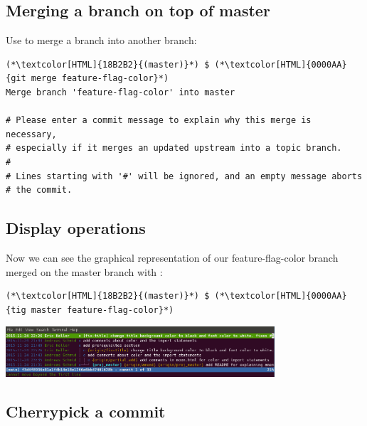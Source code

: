 \subsection{Merging a branch on top of master}
\begin{frame}[fragile]
  \subslidetitle

  Use  to merge a branch into another branch:

  \begin{lstlisting}
(*\textcolor[HTML]{18B2B2}{(master)}*) $ (*\textcolor[HTML]{0000AA}{git merge feature-flag-color}*)
Merge branch 'feature-flag-color' into master

# Please enter a commit message to explain why this merge is necessary,
# especially if it merges an updated upstream into a topic branch.
#
# Lines starting with '#' will be ignored, and an empty message aborts
# the commit.
\end{lstlisting}


\end{frame}

\subsection{Display operations}
\begin{frame}[fragile]
  \subslidetitle

  Now we can see the graphical representation of our feature-flag-color branch merged on the master branch with :
  \begin{lstlisting}
(*\textcolor[HTML]{18B2B2}{(master)}*) $ (*\textcolor[HTML]{0000AA}{tig master feature-flag-color}*)
\end{lstlisting}

  \vspace{1em}

  \centerline{\includegraphics[width=10cm]{../screen/tig-fix-title-rebase-master.png}}

\end{frame}


\subsection{Cherrypick a commit}
\begin{frame}[fragile]
    \subslidetitle
\end{frame}

